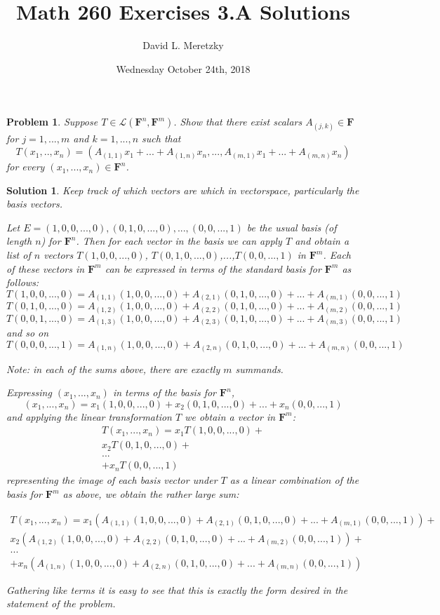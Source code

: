 \documentclass{article}
\title{ \vspace{-10ex} %
Math 260 Exercises 3.A Solutions
}
\author{David L. Meretzky
}
\date{%
Wednesday October 24th, 2018
}
\theoremstyle{problemstyle}
\newtheorem{problem}{Problem}
\theoremstyle{problemstyle}
\newtheorem{solution}{Solution}
\begin{document}
\maketitle

\begin{problem}
Suppose $T \in \mathscr{L}(\textbf{F}^n,\textbf{F}^m)$. Show that there exist scalars $A_{(j,k)} \in \textbf{F}$ for $j = 1,...,m$ and $k = 1,...,n$ such that $$T(x_1,..,x_n) = (A_{(1,1)}x_1+...+A_{(1,n)}x_n,...,A_{(m,1)}x_1+...+A_{(m,n)}x_n)$$ for every $(x_1,...,x_n) \in \textbf{F}^n$.
\end{problem}

\begin{solution}
Keep track of which vectors are which in vectorspace, particularly the basis vectors. 

Let $E = (1,0,0,...,0),(0,1,0,...,0),...,(0,0,...,1)$ be the usual basis (of length $n$) for $\textbf{F}^n$. Then for each vector in the basis we can apply $T$ and obtain a list of $n$ vectors $T(1,0,0,...,0)$, $T(0,1,0,...,0)$,...,$T(0,0,...,1)$ in $\textbf{F}^m$. Each of these vectors in $\textbf{F}^m$ can be expressed in terms of the standard basis for $\textbf{F}^m$ as follows: 
$$T(1,0,0,...,0) = A_{(1,1)}(1,0,0,...,0)+A_{(2,1)}(0,1,0,...,0)+...+A_{(m,1)}(0,0,...,1)$$
$$T(0,1,0,...,0) = A_{(1,2)}(1,0,0,...,0)+A_{(2,2)}(0,1,0,...,0)+...+A_{(m,2)}(0,0,...,1)$$
$$T(0,0,1,...,0) = A_{(1,3)}(1,0,0,...,0)+A_{(2,3)}(0,1,0,...,0)+...+A_{(m,3)}(0,0,...,1)$$
and so on 
$$T(0,0,0,...,1) = A_{(1,n)}(1,0,0,...,0)+A_{(2,n)}(0,1,0,...,0)+...+A_{(m,n)}(0,0,...,1)$$

Note: in each of the sums above, there are exactly $m$ summands. 

Expressing $(x_1,...,x_n)$ in terms of the basis for $\textbf{F}^n$, $$(x_1,...,x_n) = x_1(1,0,0,...,0)+x_2(0,1,0,...,0)+...+x_n(0,0,...,1)$$ and applying the linear transformation $T$ we obtain a vector in $\textbf{F}^m$: \begin{align*}T(x_1,...,x_n) = x_1T(1,0,0,...,0)+\\x_2T(0,1,0,...,0)+\\...\\+x_nT(0,0,...,1)\end{align*} 
representing the image of each basis vector under $T$ as a linear combination of the basis for $\textbf{F}^m$ as above, we obtain the rather large sum: 

\begin{align*}T(x_1,...,x_n) = x_1(A_{(1,1)}(1,0,0,...,0)+A_{(2,1)}(0,1,0,...,0)+...+A_{(m,1)}(0,0,...,1)) +\\ x_2(A_{(1,2)}(1,0,0,...,0)+A_{(2,2)}(0,1,0,...,0)+...+A_{(m,2)}(0,0,...,1))+ \\ ...\\+x_n(A_{(1,n)}(1,0,0,...,0)+A_{(2,n)}(0,1,0,...,0)+...+A_{(m,n)}(0,0,...,1))\end{align*}

Gathering like terms it is easy to see that this is exactly the form desired in the statement of the problem. 
\end{solution}
\end{document}
